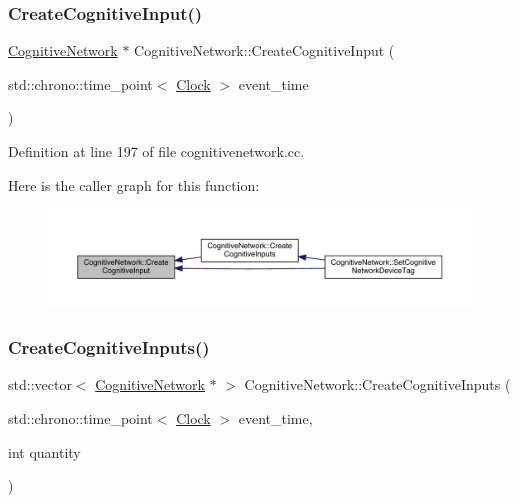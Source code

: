 \subsubsection{\texorpdfstring{Create\+Cognitive\+Input()}{CreateCognitiveInput()}}
{\footnotesize\ttfamily \hyperlink{class_cognitive_network}{Cognitive\+Network} $\ast$ Cognitive\+Network\+::\+Create\+Cognitive\+Input (\begin{DoxyParamCaption}\item[{std\+::chrono\+::time\+\_\+point$<$ \hyperlink{universe_8h_a0ef8d951d1ca5ab3cfaf7ab4c7a6fd80}{Clock} $>$}]{event\+\_\+time }\end{DoxyParamCaption})}



Definition at line 197 of file cognitivenetwork.\+cc.

Here is the caller graph for this function\+:
\nopagebreak
\begin{figure}[H]
\begin{center}
\leavevmode
\includegraphics[width=350pt]{class_cognitive_network_add96197c3dc51d94d06edb480fbc4a38_icgraph}
\end{center}
\end{figure}
\mbox{\label{class_cognitive_network_a0833f7b587f14e0c0778661a56bce957}} 
\subsubsection{\texorpdfstring{Create\+Cognitive\+Inputs()}{CreateCognitiveInputs()}}
{\footnotesize\ttfamily std\+::vector$<$ \hyperlink{class_cognitive_network}{Cognitive\+Network} $\ast$ $>$ Cognitive\+Network\+::\+Create\+Cognitive\+Inputs (\begin{DoxyParamCaption}\item[{std\+::chrono\+::time\+\_\+point$<$ \hyperlink{universe_8h_a0ef8d951d1ca5ab3cfaf7ab4c7a6fd80}{Clock} $>$}]{event\+\_\+time,  }\item[{int}]{quantity }\end{DoxyParamCaption})}



